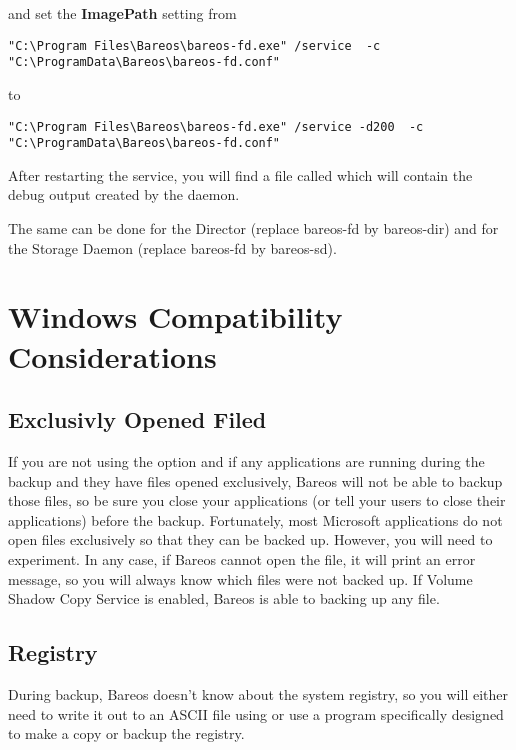 and set the \textbf{ImagePath} setting from

{
\footnotesize
\begin{verbatim}
"C:\Program Files\Bareos\bareos-fd.exe" /service  -c "C:\ProgramData\Bareos\bareos-fd.conf"
\end{verbatim}
}

to

{
\footnotesize
\begin{verbatim}
"C:\Program Files\Bareos\bareos-fd.exe" /service -d200  -c "C:\ProgramData\Bareos\bareos-fd.conf"
\end{verbatim}
}

After restarting the service, you will find a file called  which will
contain the debug output created by the daemon.

The same can be done for the Director (replace bareos-fd by bareos-dir) and for the Storage Daemon (replace bareos-fd by bareos-sd).

\section{Windows Compatibility Considerations}
\label{Compatibility}

\subsection{Exclusivly Opened Filed}
If you are not using the  option and if any applications are running during
the backup and they have files opened exclusively, Bareos will not be able
to backup those files, so be sure you close your applications (or tell your
users to close their applications) before the backup.  Fortunately, most
Microsoft applications do not open files exclusively so that they can be
backed up.  However, you will need to experiment.  In any case, if Bareos
cannot open the file, it will print an error message, so you will always
know which files were not backed up.
If Volume Shadow Copy Service is enabled, Bareos is able to backing up any
file.

\subsection{Registry}
During backup, Bareos doesn't know about the system registry, so you will
either need to write it out to an ASCII file using  or use a
program specifically designed to make a copy or backup the registry.


